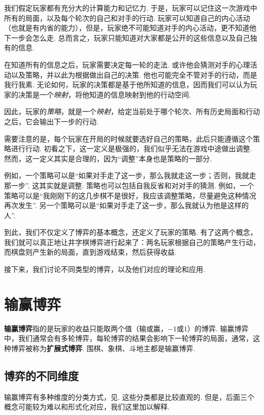 我们假定玩家都有充分大的计算能力和记忆力. 于是，玩家可以记住这一次游戏中所有的局面，以及每个轮次的自己和对手的行动. 玩家可以知道自己的内心活动（也就是有内省的能力），但是，玩家绝不可能知道对手的内心活动，更不知道他下一步会怎么走. 总而言之，玩家只能知道对大家都是公开的这些信息以及自己独有的信息. 

在知道所有的信息之后，玩家需要决定每一轮的走法. 或许他会猜测对手的心理活动以及策略，并以此为根据做出自己的决策. 他也可能完全不管对手的行动，而是我行我素. 无论如何，玩家的决策都是基于他所知道的信息，因而我们可以认为玩家的决策是一个\textit{映射}，将他知道的信息映射到他的行动空间. 

因此，玩家的\textit{策略}，就是一个\textit{映射}，给定当前处于哪个轮次、所有历史局面和行动之后，它会输出下一步的行动. 

需要注意的是，每个玩家在开局的时候就要选好自己的策略，此后只能遵循这个策略进行行动. 初看之下，这一定义是极强的，我们似乎无法在游戏中途做出调整. 然而，这一定义其实是合理的，因为“调整”本身也是策略的一部分. 

例如，一个策略可以是“如果对手走了这一步，那么我就走这一步；否则，我就走那一步”. 这其实就是调整. 策略也可以包括自我反省和对对手的猜测. 例如，一个策略可以是“我刚刚下的这几步棋不是很好，我应该调整策略，尽量避免这种情况再次发生”. 另一个策略可以是“如果对手走了这一步，那么我就认为他是这样的人”.

到此，我们不仅定义了博弈的基本概念，还定义了玩家的策略. 有了这两个概念，我们就可以真正地让井字棋博弈进行起来了：两名玩家根据自己的策略产生行动，而棋盘则产生新的局面，直到游戏结束，然后获得收益. 

接下来，我们讨论不同类型的博弈，以及他们对应的理论和应用. 

\section{输赢博弈}

\textbf{输赢博弈}指的是玩家的收益只能取两个值（输或赢，$-1$或$1$）的博弈. 输赢博弈中，我们通常会有多轮博弈，每轮博弈的结果会影响下一轮博弈的局面，通常，这种博弈被称为\textbf{扩展式博弈}. 围棋、象棋、斗地主都是输赢博弈. 

\subsection{博弈的不同维度}

输赢博弈有多种维度的分类方式，见. 这些分类都是比较直观的. 但是，后面三个概念可能较为难以和形式化对应，我们这里加以解释. 

